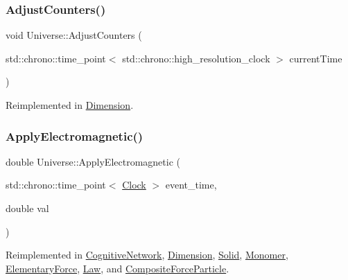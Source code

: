 \subsubsection{\texorpdfstring{Adjust\+Counters()}{AdjustCounters()}}
{\footnotesize\ttfamily void Universe\+::\+Adjust\+Counters (\begin{DoxyParamCaption}\item[{std\+::chrono\+::time\+\_\+point$<$ std\+::chrono\+::high\+\_\+resolution\+\_\+clock $>$}]{current\+Time }\end{DoxyParamCaption})\hspace{0.3cm}{\ttfamily [virtual]}}



Reimplemented in \mbox{\hyperlink{classDimension_a31e28c2777888449fad32843f6dd15ed}{Dimension}}.

\mbox{\label{classUniverse_a1f787da78fa196ba635db21a9e91dabb}} 
\subsubsection{\texorpdfstring{Apply\+Electromagnetic()}{ApplyElectromagnetic()}}
{\footnotesize\ttfamily double Universe\+::\+Apply\+Electromagnetic (\begin{DoxyParamCaption}\item[{std\+::chrono\+::time\+\_\+point$<$ \mbox{\hyperlink{universe_8h_a0ef8d951d1ca5ab3cfaf7ab4c7a6fd80}{Clock}} $>$}]{event\+\_\+time,  }\item[{double}]{val }\end{DoxyParamCaption})\hspace{0.3cm}{\ttfamily [virtual]}}



Reimplemented in \mbox{\hyperlink{classCognitiveNetwork_ae590ecb77db0a876425b9b74bcfe2bce}{Cognitive\+Network}}, \mbox{\hyperlink{classDimension_a65bcd3c09792cf53b1f614eff49cf111}{Dimension}}, \mbox{\hyperlink{classSolid_ab546d607d6f0bf70dc5e6bbac8baf287}{Solid}}, \mbox{\hyperlink{classMonomer_ae64dfbf82610ae26427be9c824aef70f}{Monomer}}, \mbox{\hyperlink{classElementaryForce_a0045a3380e468c6cfdbefce829888c1f}{Elementary\+Force}}, \mbox{\hyperlink{classLaw_a418791aee2a9204a99d3a917b86fafd3}{Law}}, and \mbox{\hyperlink{classCompositeForceParticle_afa4dc18258722b3c85fbc9789a4297a5}{Composite\+Force\+Particle}}.

